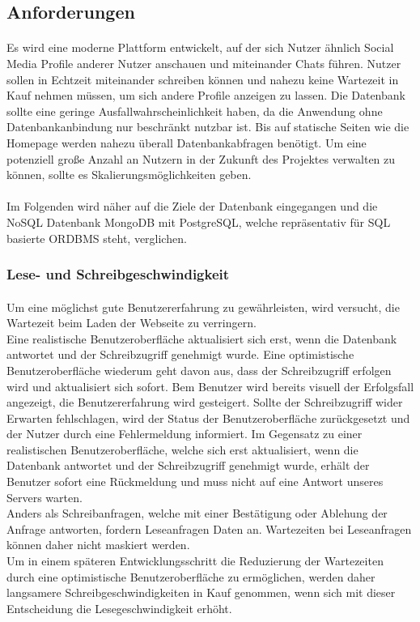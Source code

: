 \subsection{Anforderungen}
\paragraph{}
Es wird eine moderne Plattform entwickelt, auf der sich Nutzer ähnlich Social Media Profile anderer Nutzer anschauen und miteinander Chats führen.
Nutzer sollen in Echtzeit miteinander schreiben können und nahezu keine Wartezeit in Kauf nehmen müssen, um sich andere Profile anzeigen zu lassen.
Die Datenbank sollte eine geringe Ausfallwahrscheinlichkeit haben, da die Anwendung ohne Datenbankanbindung nur beschränkt nutzbar ist.
Bis auf statische Seiten wie die Homepage werden nahezu überall Datenbankabfragen benötigt.
Um eine potenziell große Anzahl an Nutzern in der Zukunft des Projektes verwalten zu können, sollte es Skalierungsmöglichkeiten geben.

\paragraph{}
Im Folgenden wird näher auf die Ziele der Datenbank eingegangen und die NoSQL Datenbank MongoDB mit PostgreSQL, welche repräsentativ für SQL basierte ORDBMS steht, verglichen. 

\subsubsection{Lese- und Schreibgeschwindigkeit}
\paragraph{}
Um eine möglichst gute Benutzererfahrung zu gewährleisten, wird versucht, die Wartezeit beim Laden der Webseite zu verringern.\\
Eine realistische Benutzeroberfläche aktualisiert sich erst, wenn die Datenbank antwortet und der Schreibzugriff genehmigt wurde.
Eine optimistische Benutzeroberfläche wiederum geht davon aus, dass der Schreibzugriff erfolgen wird und aktualisiert sich sofort.
Bem Benutzer wird bereits visuell der Erfolgsfall angezeigt, die Benutzererfahrung wird gesteigert.
Sollte der Schreibzugriff wider Erwarten fehlschlagen, wird der Status der Benutzeroberfläche zurückgesetzt und der Nutzer durch eine Fehlermeldung informiert.
Im Gegensatz zu einer realistischen Benutzeroberfläche, welche sich erst aktualisiert, wenn die Datenbank antwortet und der Schreibzugriff genehmigt wurde, erhält der Benutzer sofort eine Rückmeldung und muss nicht auf eine Antwort unseres Servers warten.\\
Anders als Schreibanfragen, welche mit einer Bestätigung oder Ablehung der Anfrage antworten, fordern Leseanfragen Daten an.
Wartezeiten bei Leseanfragen können daher nicht maskiert werden.\\
Um in einem späteren Entwicklungsschritt die Reduzierung der Wartezeiten durch eine optimistische Benutzeroberfläche zu ermöglichen, werden daher langsamere Schreibgeschwindigkeiten in Kauf genommen, wenn sich mit dieser Entscheidung die Lesegeschwindigkeit erhöht.

